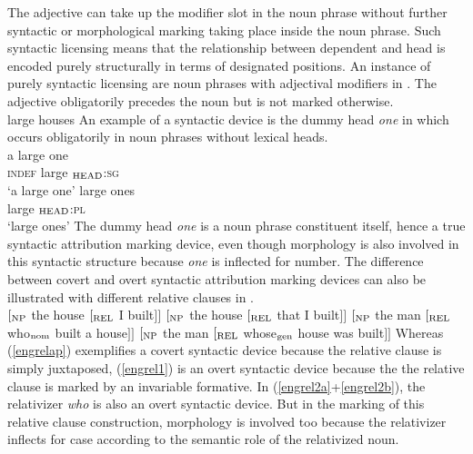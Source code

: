 The adjective can take up the modifier slot in the noun phrase without further syntactic or morphological marking taking place inside the noun phrase. Such syntactic licensing means that the relationship between dependent and head is encoded purely structurally in terms of designated positions. An instance of purely syntactic licensing are noun phrases with adjectival modifiers in . The adjective obligatorily precedes the noun but is not marked otherwise.
\ea 
{}\\
large houses
\z
An example of a syntactic device is the dummy head \textit{one} in  which occurs obligatorily in noun phrases without lexical heads.
\ea
{}\\
\ea
\gll 	a large one\\
   	\textsc{indef} large $_{\rm HEAD}$\textsc{:sg}\\
\glt ‘a large one’
\ex
\gll	large ones\\
    	large $_{\rm HEAD}$\textsc{:pl}\\
\glt ‘large ones’
\z
\z
The dummy head \textit{one} is a noun phrase constituent itself, hence a true syntactic attribution marking device, even though morphology is also involved in this syntactic structure because \textit{one} is inflected for number. The difference between covert and overt syntactic attribution marking devices can also be illustrated with different relative clauses in .
\ea
{}\\
\ea $[_{\rm NP}$ the house $[_{\rm REL}$ I built$] ]$ \label{engrelap}
\ex $[_{\rm NP}$ the house $[_{\rm REL}$ that I built$] ]$ \label{engrel1}
\ea $[_{\rm NP}$ the man $[_{\rm REL}$ who$_{\rm nom}$ built a house$] ]$ \label{engrel2a}
\ex $[_{\rm NP}$ the man $[_{\rm REL}$ whose$_{\rm gen}$ house was built$] ]$ \label{engrel2b}
\z
\z
\z
Whereas (\ref{engrelap}) exemplifies a covert syntactic device because the relative clause is simply juxtaposed, (\ref{engrel1}) is an overt syntactic device because the the relative clause is marked by an invariable formative. In (\ref{engrel2a}+\ref{engrel2b}), the relativizer \textit{who} is also an overt syntactic device. But in the marking of this relative clause construction, morphology is involved too because the relativizer inflects for case according to the semantic role of the relativized noun.

